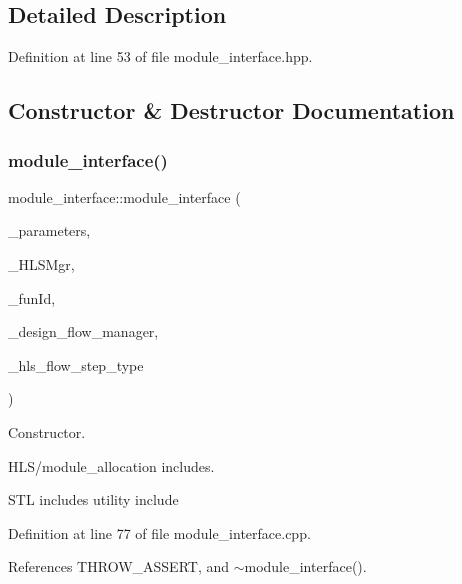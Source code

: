 \subsection{Detailed Description}


Definition at line 53 of file module\+\_\+interface.\+hpp.



\subsection{Constructor \& Destructor Documentation}
\mbox{\label{classmodule__interface_a431ffd0a2b0d67a4d545a98cf75d6758}} 
\subsubsection{\texorpdfstring{module\+\_\+interface()}{module\_interface()}}
{\footnotesize\ttfamily module\+\_\+interface\+::module\+\_\+interface (\begin{DoxyParamCaption}\item[{const \hyperlink{Parameter_8hpp_a37841774a6fcb479b597fdf8955eb4ea}{Parameter\+Const\+Ref}}]{\+\_\+parameters,  }\item[{const \hyperlink{hls__manager_8hpp_acd3842b8589fe52c08fc0b2fcc813bfe}{H\+L\+S\+\_\+manager\+Ref}}]{\+\_\+\+H\+L\+S\+Mgr,  }\item[{unsigned int}]{\+\_\+fun\+Id,  }\item[{const Design\+Flow\+Manager\+Const\+Ref}]{\+\_\+design\+\_\+flow\+\_\+manager,  }\item[{const \hyperlink{hls__step_8hpp_ada16bc22905016180e26fc7e39537f8d}{H\+L\+S\+Flow\+Step\+\_\+\+Type}}]{\+\_\+hls\+\_\+flow\+\_\+step\+\_\+type }\end{DoxyParamCaption})}



Constructor. 

H\+L\+S/module\+\_\+allocation includes.

S\+TL includes utility include 

Definition at line 77 of file module\+\_\+interface.\+cpp.



References T\+H\+R\+O\+W\+\_\+\+A\+S\+S\+E\+RT, and $\sim$module\+\_\+interface().

